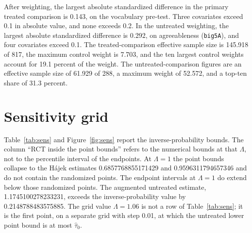 \documentclass[twoside,11pt]{article}
\begin{document}
After weighting, the largest absolute standardized difference in the primary treated comparison is 0.143, on the vocabulary pre-test. Three covariates exceed 0.1 in absolute value, and none exceeds 0.2. In the untreated weighting, the largest absolute standardized difference is 0.292, on agreeableness (\texttt{big5A}), and four covariates exceed 0.1. The treated-comparison effective sample size is 145.918 of 817, the maximum control weight is 7.703, and the ten largest control weights account for 19.1 percent of the weight. The untreated-comparison figures are an effective sample size of 61.929 of 288, a maximum weight of 52.572, and a top-ten share of 31.3 percent.

\section{Sensitivity grid}
\label{sec:sens}

Table~\ref{tab:sens} and Figure~\ref{fig:sens} report the inverse-probability bounds. The column ``RCT inside the point bounds'' refers to the numerical bounds at that $\Lambda$, not to the percentile interval of the endpoints. At $\Lambda=1$ the point bounds collapse to the H{\'a}jek estimates 0.6857768855171429 and 0.9596311794657346 and do not contain the randomized points. The endpoint intervals at $\Lambda=1$ do extend below those randomized points. The augmented untreated estimate, 1.1745100278233231, exceeds the inverse-probability value by 0.2148788483575885. The grid value $\Lambda=1.06$ is not a row of Table~\ref{tab:sens}; it is the first point, on a separate grid with step 0.01, at which the untreated lower point bound is at most $\widehat\tau_0$.
\end{document}
